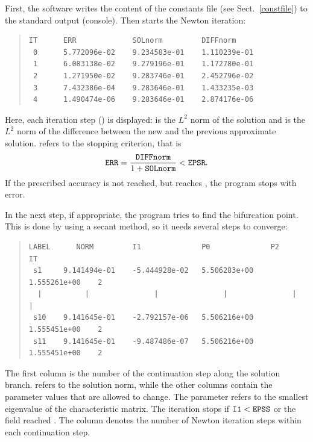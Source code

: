 \documentclass[10pt,a4paper]{ddedoc}
\begin{document}
First, the software writes the content of the constants file (see Sect.\ \ref{constfile}) to the standard output (console). Then starts the Newton iteration:
{ \small \begin{quote} \begin{lstlisting}[basicstyle=\tt,frame=single]
IT      ERR             SOLnorm         DIFFnorm
 0      5.772096e-02    9.234583e-01    1.110239e-01
 1      6.083138e-02    9.279196e-01    1.172780e-01
 2      1.271950e-02    9.283746e-01    2.452796e-02
 3      7.432386e-04    9.283646e-01    1.433235e-03
 4      1.490474e-06    9.283646e-01    2.874176e-06
\end{lstlisting} \end{quote} } \noindent
Here, each iteration step () is displayed:  is the $L^2$ norm of the solution and  is the $L^2$ norm of the difference between the new and the previous approximate solution.  refers to the stopping criterion, that is
\[
	{\tt ERR} = \frac{{\tt DIFFnorm}}{1+{\tt SOLnorm}} < {\tt EPSR}.
\]
If the prescribed accuracy is not reached, but  reaches , the program stops with error.

In the next step, if appropriate, the program tries to find the bifurcation point. This is done by using a secant method, so it needs several steps to converge:
{ \small \begin{quote} \begin{lstlisting}[basicstyle=\tt,frame=single]
LABEL      NORM         I1              P0              P2              IT
 s1     9.141494e-01    -5.444928e-02   5.506283e+00    1.555261e+00    2
  |          |               |               |               |          |
 s10    9.141645e-01    -2.792157e-06   5.506216e+00    1.555451e+00    2
 s11    9.141645e-01    -9.487486e-07   5.506216e+00    1.555451e+00    2
\end{lstlisting} \end{quote} } \noindent
The first column is the number of the continuation step along the solution branch.  refers to the solution norm, while the other columns contain the parameter values that are allowed to change. The parameter  refers to the smallest eigenvalue of the characteristic matrix. The iteration stops if ${\tt I1} < {\tt EPSS}$ or the  field reached . The  column denotes the number of Newton iteration steps within each continuation step.
\end{document}
